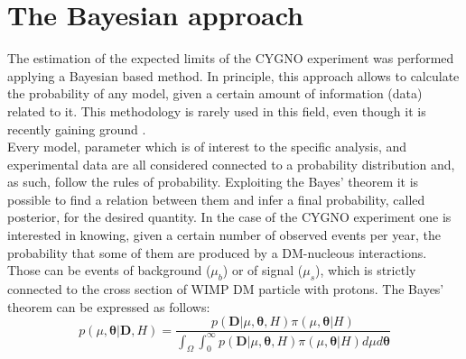 \documentclass[physics,article,submit,moreauthors,pdftex]{Definitions/mdpi}
\begin{document}
\section{The Bayesian approach}
The estimation of the expected limits of the CYGNO experiment was performed applying a Bayesian based method. In principle, this approach allows to calculate the probability of any model, given a certain amount of information (data) related to it. This methodology is rarely used in this field, even though it is recently gaining ground \cite{bib:ROSZKOWSKI200910,bib:TROTTA2007316,bib:Strege_2012,bib:arina2014bayesian,bib:Bringmann_2017,bib:Liem_2016,bib:Messina_2020,bib:di_Cortona_2020}.\\
Every model, parameter which is of interest to the specific analysis, and experimental data are all considered connected to a probability distribution and, as such, follow the rules of probability. Exploiting the Bayes' theorem it is possible to find a relation between them and infer a final probability, called posterior, for the desired quantity. 
In the case of the CYGNO experiment one is interested in knowing, given a certain number of observed events per year, the probability that some of them are produced by a DM-nucleous interactions.
Those can be events of background ($\mu_b$) or of signal ($\mu_s$), which is strictly connected to the cross section of WIMP DM particle with protons. The Bayes' theorem can be expressed as follows:
\begin{equation}
\label{eq:Bayes}
 p(\mu,\boldsymbol{\theta}\vert \boldsymbol{D},H) = \frac{p(\boldsymbol{D}\vert\mu,\boldsymbol{\theta},H)\pi(\mu,\boldsymbol{\theta}\vert H) }{ \int_{\Omega}\int_{0}^{\infty}p(\boldsymbol{D}\vert \mu,\boldsymbol{\theta},H)\pi(\mu,\boldsymbol{\theta}\vert H)d\mu d\boldsymbol{\theta} } 
\end{equation}
\end{document}
